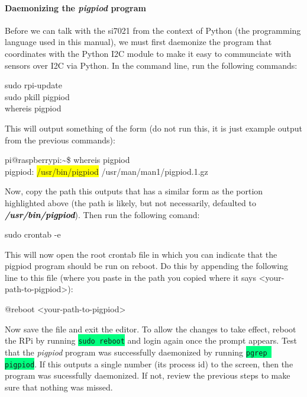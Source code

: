 \documentclass{article}
\newcommand*{\myfont}{\fontfamily{pcr}\selectfont}
\newcommand{\codei}[1]{\colorbox{SpringGreen}{\texttt{#1}}} %
\newcommand{\codeb}[2]{
  \begin{tcolorbox}[width=\textwidth,colback={SpringGreen},title={#1},colbacktitle=darkgreen,coltitle=SpringGreen]
    \myfont
    #2
  \end{tcolorbox}
} %
\newcommand{\outputb}[2]{
  \begin{tcolorbox}[width=\textwidth,colback={light-gray},title={#1},colbacktitle=gray,coltitle=light-gray]
    \myfont
    #2
  \end{tcolorbox}
} %
\newcommand{\loc}[1]{\textit{\textcolor{Black}{\textbf{#1}}}} %
\begin{document}
  \paragraph{Daemonizing the \textit{pigpiod} program}
    Before we can talk with the si7021 from the context of Python (the programming language used in this manual), we must first daemonize the program that coordinates with the Python I2C module to make it easy to communciate with sensors over I2C via Python. In the command line, run the following commands:
    \codeb{Prep the environment and locate \textit{pigpiod}}
    {
      sudo rpi-update     \\
      sudo pkill pigpiod  \\
      whereis pigpiod
    }
    This will output something of the form (do not run this, it is just example output from the previous commands):
    \outputb{\texttt{whereis pigpiod} command output}
    {
      pi@raspberrypi:\textasciitilde \$ whereis pigpiod \\
      pigpiod: \colorbox{Yellow}{/usr/bin/pigpiod} /usr/man/man1/pigpiod.1.gz
    }
    Now, copy the path this outputs that has a similar form as the portion highlighted above (the path is likely, but not necessarily, defaulted to \loc{/usr/bin/pigpiod}). Then run the following comand:
    \codeb{Open the root crontab}
    {
      sudo crontab -e
    }
    This will now open the root crontab file in which you can indicate that the pigpiod program should be run on reboot. Do this by appending the following line to this file (where you paste in the path you copied where it says <your-path-to-pigpiod>):
    \outputb{Daemonize \textit{pigpiod} command}
    {
      @reboot              <your-path-to-pigpiod>
    }
    Now save the file and exit the editor. To allow the changes to take effect, reboot the RPi by running \codei{sudo reboot} and login again once the prompt appears. Test that the \textit{pigpiod} program was successfully daemonized by running \codei{pgrep pigpiod}. If this outputs a single number (its process id) to the screen, then the program was sucessfully daemonized. If not, review the previous steps to make sure that nothing was missed.
\end{document}
